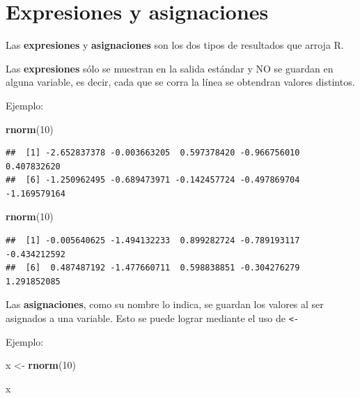 \documentclass[
]{book}
\newenvironment{Shaded}{\begin{snugshade}}{\end{snugshade}}
\newcommand{\DecValTok}[1]{\textcolor[rgb]{0.00,0.00,0.81}{#1}}
\newcommand{\FunctionTok}[1]{\textcolor[rgb]{0.13,0.29,0.53}{\textbf{#1}}}
\newcommand{\NormalTok}[1]{#1}
\newcommand{\OtherTok}[1]{\textcolor[rgb]{0.56,0.35,0.01}{#1}}
\begin{document}
\section{Expresiones y asignaciones}\label{expresiones-y-asignaciones}

Las \textbf{expresiones} y \textbf{asignaciones} son los dos tipos de resultados que arroja R.

Las \textbf{expresiones} sólo se muestran en la salida estándar y NO se guardan en alguna variable, es decir, cada que se corra la línea se obtendran valores distintos.

Ejemplo:

\begin{Shaded}
\begin{Highlighting}[]
\FunctionTok{rnorm}\NormalTok{(}\DecValTok{10}\NormalTok{)}
\end{Highlighting}
\end{Shaded}

\begin{verbatim}
##  [1] -2.652837378 -0.003663205  0.597378420 -0.966756010  0.407832620
##  [6] -1.250962495 -0.689473971 -0.142457724 -0.497869704 -1.169579164
\end{verbatim}

\begin{Shaded}
\begin{Highlighting}[]
\FunctionTok{rnorm}\NormalTok{(}\DecValTok{10}\NormalTok{)}
\end{Highlighting}
\end{Shaded}

\begin{verbatim}
##  [1] -0.005640625 -1.494132233  0.899282724 -0.789193117 -0.434212592
##  [6]  0.487487192 -1.477660711  0.598838851 -0.304276279  1.291852085
\end{verbatim}

Las \textbf{asignaciones}, como su nombre lo indica, se guardan los valores al ser asignados a una variable. Esto se puede lograr mediante el uso de \texttt{\textless{}-}

Ejemplo:

\begin{Shaded}
\begin{Highlighting}[]
\NormalTok{x }\OtherTok{\textless{}{-}} \FunctionTok{rnorm}\NormalTok{(}\DecValTok{10}\NormalTok{)}
\end{Highlighting}
\end{Shaded}

\begin{Shaded}
\begin{Highlighting}[]
\NormalTok{x}
\end{Highlighting}
\end{Shaded}
\end{document}
